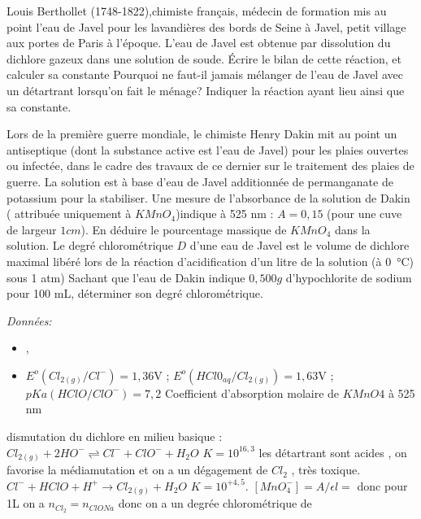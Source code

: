 \begin{Exercise}[title=Eau de Javel]
	Louis Berthollet (1748-1822),chimiste français, médecin de formation mis au point l'eau de Javel pour les lavandières des bords de Seine à Javel, petit village aux portes de Paris à l'époque.
	\Question L'eau de Javel est obtenue par dissolution du dichlore gazeux dans une solution de soude. Écrire le bilan de cette réaction, et calculer sa constante
	\Question Pourquoi ne faut-il jamais mélanger de l'eau de Javel avec un détartrant lorsqu'on fait le ménage? Indiquer la réaction ayant lieu ainsi que sa constante.

	Lors de la première guerre mondiale, le chimiste Henry Dakin mit au point un antiseptique (dont la substance active est l'eau de Javel) pour les plaies ouvertes ou infectée, dans le cadre des travaux de ce dernier sur le traitement des plaies de guerre.
	La solution est à base d'eau de Javel additionnée de permanganate de potassium pour la stabiliser.
	\Question Une mesure de l'absorbance de la solution de Dakin ( attribuée uniquement à $KMnO_4$)indique à 525 nm : $A =0,15$ (pour une cuve de largeur $1cm$). En déduire le pourcentage massique de $KMnO_4$ dans la solution.
	\Question Le degré chlorométrique $D$ d'une eau de Javel est le volume de dichlore maximal libéré lors de la réaction d'acidification d'un litre de la solution (à \SI{0}{\degreeCelsius}) sous 1 atm) Sachant que l'eau de Dakin indique $0,500g$ d'hypochlorite de sodium pour 100 mL, déterminer son degré chlorométrique.

	\emph{Données:}
	\begin{itemize}
		\item {} , 
		\item $E^o(Cl_{2(g)}/Cl^-) =1,36 $V ; $E^o(HCl0_{aq}/Cl_{2(g)}) =1,63 $V ;
		$pKa(HClO/ClO^-) = 7,2$
		Coefficient d'absorption molaire de $KMnO4 $ à 525 nm 
	\end{itemize}

\end{Exercise}
\begin{Answer}
	\Question dismutation du dichlore en milieu basique : $Cl_{2(g)}+2HO^-\rightleftharpoons Cl^-+ClO^-+H_2O$ $K=10^{16,3}$
	\Question les détartrant sont acides , on favorise la médiamutation et on a un dégagement de $Cl_2$ , très toxique. $Cl^-+HClO +H^+ \to Cl_{2(g)}+H_2O$ $K=10^{+4,5}$.
	\Question $[MnO_4^-] = A/\epsilon l = $ donc pour 1L on a 
	\Question $n_{Cl_2}=n_{ClONa}$ donc on a  un degrée chlorométrique de 

\end{Answer}
